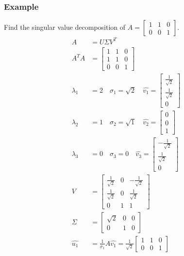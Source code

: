 \documentclass{math}
\begin{document}
\subsubsection*{Example}
Find the singular value decomposition of \( A = \begin{bmatrix}1 & 1 & 0 \\
0 & 0 & 1\end{bmatrix} \).
\begin{align*}
  A &= U\Sigma V^T \\
  A^TA &= \begin{bmatrix}
    1 & 1 & 0 \\
    1 & 1 & 0 \\
    0 & 0 & 1
  \end{bmatrix} \\
  \lambda_1 &= 2 \quad \sigma_1 = \sqrt{2} \quad \hat{v_1} = \begin{bmatrix}
    \frac{1}{\sqrt{2}} \\ \frac{1}{\sqrt{2}} \\ 0
  \end{bmatrix} \\
  \lambda_2 &= 1 \quad \sigma_2 = \sqrt{1} \quad \hat{v_2} = \begin{bmatrix}
    0 \\ 0 \\ 1
  \end{bmatrix} \\
  \lambda_3 &= 0 \quad \sigma_3 = 0 \quad \hat{v_3} = \begin{bmatrix}
    -\frac{1}{\sqrt{2}} \\ \frac{1}{\sqrt{2}} \\ 0
  \end{bmatrix} \\
  V &= \begin{bmatrix}
    \frac{1}{\sqrt{2}} & 0 & -\frac{1}{\sqrt{2}} \\
    \frac{1}{\sqrt{2}} & 0 & \frac{1}{\sqrt{2}} \\
    0 & 1 & 1
  \end{bmatrix} \\
  \Sigma &= \begin{bmatrix}
    \sqrt{2} & 0 & 0 \\
    0 & 1 & 0
  \end{bmatrix} \\
  \hat{u_1} &= \frac{1}{\sigma_1}A\hat{v_1} = \frac{1}{\sqrt{2}}\begin{bmatrix}
    1 & 1 & 0 \\
    0 & 0 & 1

\end{bmatrix}
\end{align*}
\end{document}
